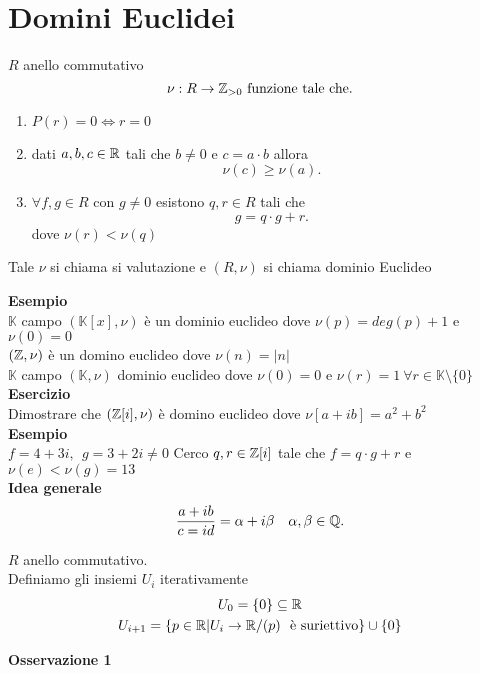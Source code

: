\documentclass{article}
\begin{document}
\section{Domini Euclidei}
\begin{defi}
	$R$ anello commutativo\\
	\[
		\nu : R \rightarrow\mathbb{Z}_{>0} \text{ funzione tale che}
	.\] 
	\begin{enumerate}
		\item $P(r) =0 \Leftrightarrow r= 0$\\
		\item dati $a,b,c\in\mathbb{R}$ tali che $b\neq 0$ e  $c = a\cdot b$ allora
			 \[
			\nu (c)\geq \nu(a)
			.\] 
		\item $\forall f,g\in R$ con  $g\neq 0$ esistono $q,r\in R$ tali che 
			 \[
			g = q\cdot g + r
			.\] 
			dove $\nu(r) < \nu (q)$
	\end{enumerate} 
	Tale $\nu$ si chiama si valutazione e $(R,\nu)$ si chiama dominio Euclideo
\end{defi}
\textbf{Esempio}\\
$\mathbb K$ campo  $(\mathbb K[x],\nu)$ è un dominio euclideo dove $\nu(p) = deg(p) + 1$ e  $\nu(0) = 0$ \\
$(\mathbb{Z},\nu)$ è un domino euclideo dove $\nu(n) = |n|$\\
$\mathbb K$ campo  $(\mathbb K,\nu)$ dominio euclideo dove $\nu(0) = 0$ e  $\nu(r) = 1 \  \forall r\in\mathbb K\setminus\{0\}$ \\
\textbf{Esercizio}\\
Dimostrare che $(\mathbb{Z}[i], \nu)$ è domino euclideo dove $\nu[a+ib] = a^2 + b^2$\\
 \textbf{Esempio}\\
 $f = 4 + 3i, \  \ g = 3 + 2i\neq 0$ Cerco  $q,r\in\mathbb{Z}[i] $ tale che $f = q\cdot g + r$ e  $\nu(e)<\nu(g) = 13$\\
 \textbf{Idea generale}
 \[
	 \frac{a + ib}{c = id} = \alpha + i\beta \ \ \ \alpha,\beta\in\mathbb{Q}
 .\] 
 \begin{defi}
 	$R$ anello commutativo.\\
	Definiamo gli insiemi $U_i$ iterativamente\\
	 \begin{gather*}
		 U_0 = \{0\}\subseteq \mathbb{R}\\
		 U_{i+1} = \{p\in\mathbb{R} | U_i  \rightarrow \mathbb{R}/(p) \ \text{ è suriettivo}\}\cup \{0\}
	\end{gather*}
 \end{defi}
 \textbf{Osservazione 1}\\
\end{document}
